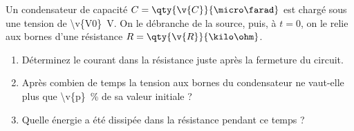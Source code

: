 Un condensateur de capacité $C = \qty{\v{C}}{\micro\farad}$ est chargé sous une tension de \qty{\v{V0}}{V}. On le débranche de la source, puis, à $t = 0$, on le relie aux bornes d'une résistance $R = \qty{\v{R}}{\kilo\ohm}$.

\begin{enumerate}[label=\alph*)]
    \item Déterminez le courant dans la résistance juste après la fermeture du circuit.
    \item Après combien de temps la tension aux bornes du condensateur ne vaut-elle plus que \qty{\v{p}}{\percent} de sa valeur initiale ?
    \item Quelle énergie a été dissipée dans la résistance pendant ce temps ?
\end{enumerate}
